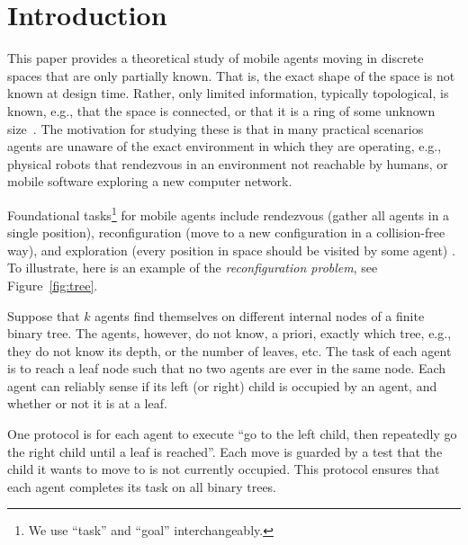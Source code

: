 

\section{Introduction} \label{sec:intro}
This paper provides a theoretical study of mobile agents moving in discrete spaces that are only partially known.  That is, the exact shape of the space is not known at design time. Rather, only limited information, typically topological, is known, e.g., that the space is connected, or that it is a ring of some unknown size~\cite{FPS11}. The motivation for studying these is that in many practical scenarios agents are unaware of the exact environment in which they are operating, e.g., physical robots that rendezvous in an environment not reachable by humans, or mobile software exploring a new computer network.

Foundational tasks\footnote{We use ``task'' and ``goal'' interchangeably.} for mobile agents include rendezvous (gather all agents in a single position), reconfiguration (move to a new configuration in a collision-free way), and exploration (every position in space should be visited by some agent) \cite{KKR07handbook,FPS11,FPS12}. To illustrate, here is an example of the \emph{reconfiguration problem}, see Figure~\ref{fig:tree}.
\begin{example}
Suppose that $k$ agents find themselves on different internal nodes of a finite binary tree. The agents, however, do not know, a priori, exactly which tree, e.g., they do not know its depth, or the number of leaves, etc. The task of each agent  is to reach a leaf node such that no two agents are ever in the same node. Each agent can reliably sense if its left (or right) child is occupied by an agent, and whether or not it is at a leaf.

One protocol is for each agent to execute ``go to the left child, then repeatedly go the right child until a leaf is reached''. Each move is guarded by a test that the child it wants to move to is not currently occupied. This protocol ensures that each agent completes its task on all binary trees.
\end{example}



